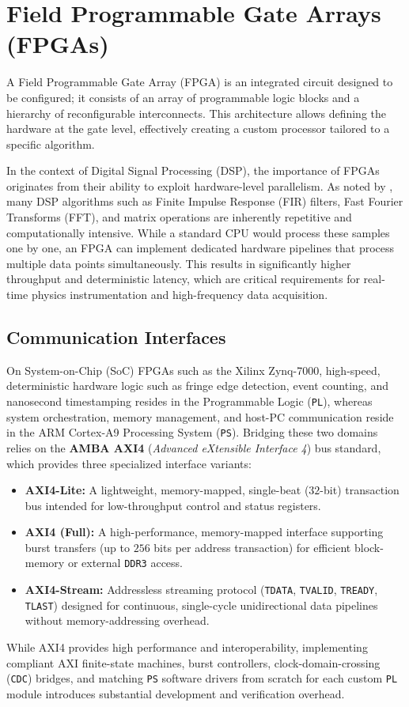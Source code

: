 \section{Field Programmable Gate Arrays (FPGAs)}

A Field Programmable Gate Array (FPGA) is an integrated circuit designed to be configured; it consists of an array of programmable logic blocks and a hierarchy of reconfigurable interconnects. This architecture allows defining the hardware at the gate level, effectively creating a custom processor tailored to a specific algorithm.


In the context of Digital Signal Processing (DSP), the importance of FPGAs originates from their ability to exploit hardware-level parallelism. As noted by \cite[pp. 1--14]{FPGAbasedImplementationSignal2008}, many DSP algorithms such as Finite Impulse Response (FIR) filters, Fast Fourier Transforms (FFT), and matrix operations are inherently repetitive and computationally intensive. While a standard CPU would process these samples one by one, an FPGA can implement dedicated hardware pipelines that process multiple data points simultaneously. This results in significantly higher throughput and deterministic latency, which are critical requirements for real-time physics instrumentation and high-frequency data acquisition.

\subsection{Communication Interfaces}
\label{sec:communication_interfaces}

On System-on-Chip (SoC) FPGAs such as the Xilinx Zynq-7000, high-speed, deterministic hardware logic such as fringe edge detection, event counting, and nanosecond timestamping resides in the Programmable Logic (\texttt{PL}), whereas system orchestration, memory management, and host-PC communication reside in the ARM Cortex-A9 Processing System (\texttt{PS}). Bridging these two domains relies on the \textbf{AMBA AXI4} (\textit{Advanced eXtensible Interface 4}) bus standard, which provides three specialized interface variants:
\begin{itemize}
    \item \textbf{AXI4-Lite:} A lightweight, memory-mapped, single-beat ($32$-bit) transaction bus intended for low-throughput control and status registers.
    \item \textbf{AXI4 (Full):} A high-performance, memory-mapped interface supporting burst transfers (up to $256$ bits per address transaction) for efficient block-memory or external \texttt{DDR3} access.
    \item \textbf{AXI4-Stream:} Addressless streaming protocol (\texttt{TDATA}, \texttt{TVALID}, \texttt{TREADY}, \texttt{TLAST}) designed for continuous, single-cycle unidirectional data pipelines without memory-addressing overhead.
\end{itemize}
While AXI4 provides high performance and interoperability, implementing compliant AXI finite-state machines, burst controllers, clock-domain-crossing (\texttt{CDC}) bridges, and matching \texttt{PS} software drivers from scratch for each custom \texttt{PL} module introduces substantial development and verification overhead.


